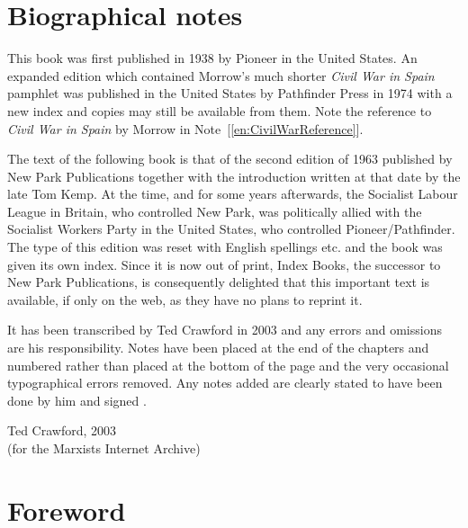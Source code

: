 \chapter{Biographical notes}

This book was first published in 1938 by Pioneer in the United States.
An expanded edition which contained Morrow’s much shorter \emph{Civil War in Spain} pamphlet was published in the United States by Path\-finder Press in 1974 with a new index and copies may still be available from them. Note the reference to \emph{Civil War in Spain} by Morrow in Note~[\ref{en:CivilWarReference}].

The text of the following book is that of the second edition of 1963 published by New Park Publications together with the introduction written at that date by the late Tom Kemp. At the time, and for some years afterwards, the Socialist Labour League in Britain, who controlled New Park, was politically allied with the Socialist Workers Party in the United States, who controlled Pioneer/Pathfinder. The type of this edition was reset with English spellings etc. and the book was given its own index. Since it is now out of print, Index Books, the successor to New Park Publications, is consequently delighted that this important text is available, if only on the web, as they have no plans to reprint it.

It has been transcribed by Ted Crawford in 2003 and any errors and omissions are his responsibility. Notes have been placed at the end of the chapters and numbered rather than placed at the bottom of the page and the very occasional typographical errors removed. Any notes added are clearly stated to have been done by him and signed \ERC.

\begin{flushright}
	Ted Crawford, 2003 \\
	(for the Marxists Internet Archive)
\end{flushright}

\chapter{Foreword}

